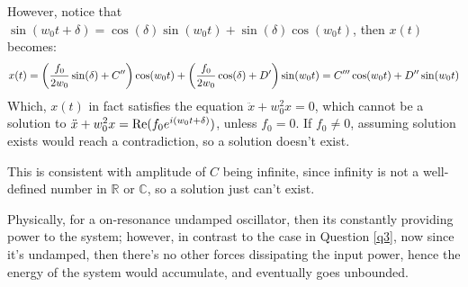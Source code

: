 \documentclass{article}
\newcommand{\RR}{\mathbb{R}}
\newcommand{\CC}{\mathbb{C}}
\DeclarePairedDelimiter{\paran}{(}{)}%
\newcommand{\Real}{\textmd{Re}}
\begin{document}
However, notice that $\sin(w_0t+\delta) = \cos(\delta)\sin(w_0t)+\sin(\delta)\cos(w_0t)$, then $x(t)$ becomes:
\begin{equation}
    x(t)=\paran*{\frac{f_0}{2w_0}\sin(\delta)+C''}\cos(w_0t)+\paran*{\frac{f_0}{2w_0}\cos(\delta)+D'}\sin(w_0t) = C'''\cos(w_0t)+D''\sin(w_0t)
\end{equation}
Which, $x(t)$ in fact satisfies the equation $\ddot x+w_0^2 x=0$, which cannot be a solution to $\ddot x+w_0^2x = \Real(f_0e^{i(w_0t+\delta)})$, unless $f_0 = 0$. If $f_0\neq 0$, assuming solution exists would reach a contradiction, so a solution doesn't exist.

\hfil

This is consistent with amplitude of $C$ being infinite, since infinity is not a well-defined number in $\RR$ or $\CC$, so a solution just can't exist.

Physically, for a on-resonance undamped oscillator, then its constantly providing power to the system; however, in contrast to the case in Question \ref{q3}, now since it's undamped, then there's no other forces dissipating the input power, hence the energy of the system would accumulate, and eventually goes unbounded.

\break
\end{document}

